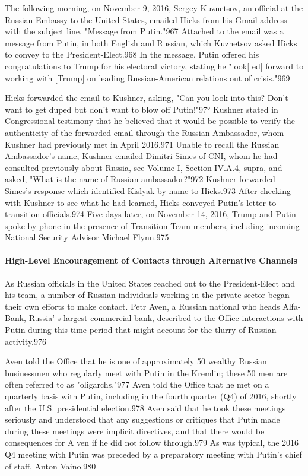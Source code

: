 The following morning, on November 9, 2016, Sergey Kuznetsov, an official at the Russian Embassy to the United States, emailed Hicks from his Gmail address with the subject line, "Message from Putin."967 Attached to the email was a message from Putin, in both English and Russian, which Kuznetsov asked Hicks to convey to the President-Elect.968 In the message, Putin offered his congratulations to Trump for his electoral victory, stating he "look[ ed] forward to working with [Trump] on leading Russian-American relations out of crisis."969

Hicks forwarded the email to Kushner, asking, "Can you look into this? Don't want to get duped but don't want to blow off Putin!"97° Kushner stated in Congressional testimony that he believed that it  would be possible to verify the authenticity of the forwarded email through the Russian Ambassador, whom Kushner had previously met in April 2016.971 Unable to recall the Russian Ambassador's name, Kushner emailed Dimitri Simes of CNI, whom he had consulted previously about Russia, see Volume I,  Section IV.A.4, supra, and asked, "What is the name of Russian ambassador?"972 Kushner forwarded Simes's response-which identified Kislyak by name-to Hicks.973 After checking with Kushner to see what he had learned,  Hicks conveyed Putin's letter to transition officials.974 Five days later, on November 14, 2016, Trump and Putin spoke by phone in the presence of Transition Team members, including incoming National Security Advisor Michael Flynn.975

\paragraph{High-Level Encouragement of Contacts through Alternative Channels}

As Russian officials in the United States reached out to the President-Elect and his team, a number of Russian individuals working in the private sector began their own efforts to make contact. Petr Aven, a Russian national who heads Alfa-Bank, Russia' s largest commercial bank, described to the Office interactions with Putin during this time period that might account for the tlurry of Russian activity.976

Aven told the Office that he is one of approximately 50 wealthy Russian businessmen who regularly meet with Putin in the Kremlin; these 50 men are often referred to as "oligarchs."977 Aven told the Office that he met on a  quarterly basis with Putin, including in the fourth quarter (Q4) of 2016, shortly after the U.S. presidential election.978 Aven said that he took these meetings seriously and understood that any suggestions or critiques that Putin made during these meetings were implicit directives, and that there would be consequences for A ven if he did not follow through.979 As was typical, the 2016 Q4 meeting with Putin was preceded by a preparatory meeting with Putin's chief of staff, Anton Vaino.980

